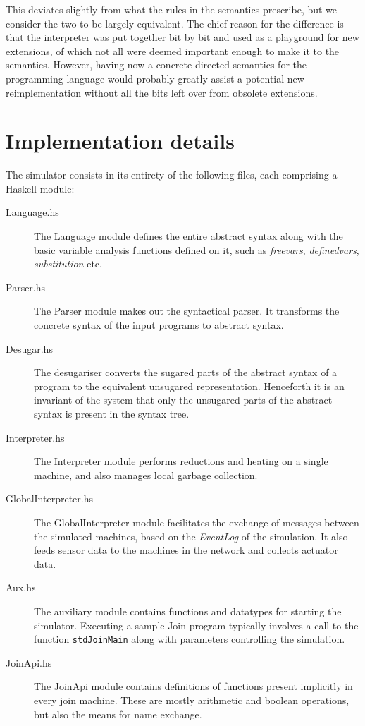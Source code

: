 This deviates slightly from what the rules in the semantics prescribe, but we
consider the two to be largely equivalent. The chief reason for the difference
is that the interpreter was put together bit by bit and used as a playground for
new extensions, of which not all were deemed important enough to make it to the
semantics. However, having now a concrete directed semantics for the programming
language would probably greatly assist a potential new reimplementation without
all the bits left over from obsolete extensions.

\section{Implementation details}
The simulator consists in its entirety of the following files, each comprising a
Haskell module:
\begin{description}

\item[Language.hs] The Language module defines the entire abstract syntax along
with the basic variable analysis functions defined on it, such as
\emph{freevars}, \emph{definedvars}, \emph{substitution} etc.

\item[Parser.hs] The Parser module makes out the syntactical parser. It
transforms the concrete syntax of the input programs to abstract syntax.

\item[Desugar.hs] The desugariser converts the sugared parts of the abstract
syntax of a program to the equivalent unsugared representation. Henceforth it is
an invariant of the system that only the unsugared parts of the abstract syntax
is present in the syntax tree.

\item[Interpreter.hs] The Interpreter module performs reductions and heating on
a single machine, and also manages local garbage collection.

\item[GlobalInterpreter.hs] The GlobalInterpreter module facilitates the
exchange of messages between the simulated machines, based on the
\emph{EventLog} of the simulation. It also feeds sensor data to the machines in
the network and collects actuator data.

\item[Aux.hs] The auxiliary module contains functions and datatypes for starting
the simulator. Executing a sample Join program typically involves a call to the
function \texttt{stdJoinMain} along with parameters controlling the simulation.

\item[JoinApi.hs] The JoinApi module contains definitions of functions present
implicitly in every join machine. These are mostly arithmetic and boolean
operations, but also the means for name exchange.

\end{description}

